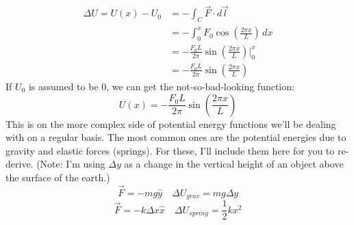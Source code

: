 \begin{align*}
	\Delta U = U(x) - U_0 &= - \int_C \vec F \cdot d\vec l \\
	&= - \int_0^x  F_0 \cos \left(\frac{2\pi x}{L} \right) \, dx\\
	&= - \frac{F_0L}{2\pi} \sin \left(\frac{2\pi x}{L} \right) \Big|_0^x \\
	&= - \frac{F_0L}{2\pi} \sin \left(\frac{2\pi x}{L} \right)
\end{align*}
If $U_0$ is assumed to be $0$, we can get the not-so-bad-looking function:
\[
	U(x) = - \frac{F_0L}{2\pi} \sin \left(\frac{2\pi x}{L} \right)
\]
This is on the more complex side of potential energy functions we'll be dealing with on a regular basis. The most common ones are the potential energies due to gravity and elastic forces (springs). For these, I'll include them here for you to re-derive. (Note: I'm using $\Delta y$ as a change in the vertical height of an object above the surface of the earth.)
\[
	\vec F = -mg\hat y \quad \Delta U_{grav} = mg\Delta y
\]
\[
	\vec F = -k\Delta x \hat x \quad \Delta U_{spring} = \frac{1}{2}kx^2
\]
